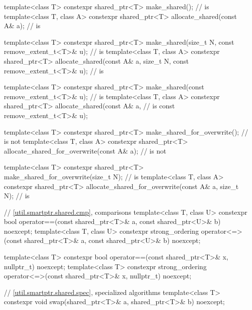 \begin{codeblock}
{  template<class T>
    constexpr shared_ptr<T> make_shared();                                          //  is 
  template<class T, class A>
    constexpr shared_ptr<T> allocate_shared(const A& a);                            //  is 

  template<class T>
    constexpr shared_ptr<T> make_shared(size_t N, const remove_extent_t<T>& u);     //  is 
  template<class T, class A>
    constexpr shared_ptr<T> allocate_shared(const A& a, size_t N,
                                            const remove_extent_t<T>& u);           //  is 

  template<class T>
    constexpr shared_ptr<T> make_shared(const remove_extent_t<T>& u);               //  is 
  template<class T, class A>
    constexpr shared_ptr<T> allocate_shared(const A& a,                             //  is 
                                            const remove_extent_t<T>& u);

  template<class T>
    constexpr shared_ptr<T> make_shared_for_overwrite();                            //  is not 
  template<class T, class A>
    constexpr shared_ptr<T> allocate_shared_for_overwrite(const A& a);              //  is not 

  template<class T>
    constexpr shared_ptr<T> make_shared_for_overwrite(size_t N);                    //  is 
  template<class T, class A>
    constexpr shared_ptr<T> allocate_shared_for_overwrite(const A& a, size_t N);    //  is 

  // \ref{util.smartptr.shared.cmp},  comparisons
  template<class T, class U>
    constexpr bool operator==(const shared_ptr<T>& a, const shared_ptr<U>& b) noexcept;
  template<class T, class U>
    constexpr strong_ordering operator<=>(const shared_ptr<T>& a,
                                          const shared_ptr<U>& b) noexcept;

  template<class T>
    constexpr bool operator==(const shared_ptr<T>& x, nullptr_t) noexcept;
  template<class T>
    constexpr strong_ordering operator<=>(const shared_ptr<T>& x, nullptr_t) noexcept;

  // \ref{util.smartptr.shared.spec},  specialized algorithms
  template<class T>
    constexpr void swap(shared_ptr<T>& a, shared_ptr<T>& b) noexcept;

}
\end{codeblock}
